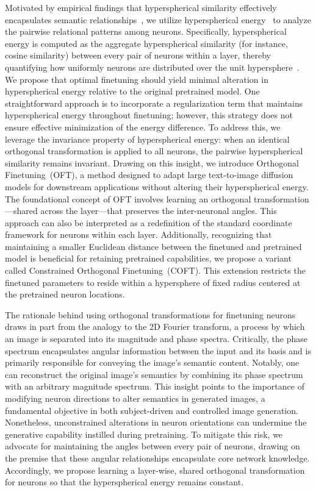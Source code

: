 Motivated by empirical findings that hyperspherical similarity effectively encapsulates semantic relationships~\cite{liu2017deep,liu2018decoupled,chen2020angular}, we utilize hyperspherical energy~\cite{liu2018learning} to analyze the pairwise relational patterns among neurons. Specifically, hyperspherical energy is computed as the aggregate hyperspherical similarity (for instance, cosine similarity) between every pair of neurons within a layer, thereby quantifying how uniformly neurons are distributed over the unit hypersphere~\cite{liu2021learning}. We propose that optimal finetuning should yield minimal alteration in hyperspherical energy relative to the original pretrained model. One straightforward approach is to incorporate a regularization term that maintains hyperspherical energy throughout finetuning; however, this strategy does not ensure effective minimization of the energy difference. To address this, we leverage the invariance property of hyperspherical energy: when an identical orthogonal transformation is applied to all neurons, the pairwise hyperspherical similarity remains invariant. Drawing on this insight, we introduce Orthogonal Finetuning~(OFT), a method designed to adapt large text-to-image diffusion models for downstream applications without altering their hyperspherical energy. The foundational concept of OFT involves learning an orthogonal transformation—shared across the layer—that preserves the inter-neuronal angles. This approach can also be interpreted as a redefinition of the standard coordinate framework for neurons within each layer. Additionally, recognizing that maintaining a smaller Euclidean distance between the finetuned and pretrained model is beneficial for retaining pretrained capabilities, we propose a variant called Constrained Orthogonal Finetuning~(COFT). This extension restricts the finetuned parameters to reside within a hypersphere of fixed radius centered at the pretrained neuron locations.

The rationale behind using orthogonal transformations for finetuning neurons draws in part from the analogy to the 2D Fourier transform, a process by which an image is separated into its magnitude and phase spectra. Critically, the phase spectrum encapsulates angular information between the input and its basis and is primarily responsible for conveying the image's semantic content. Notably, one can reconstruct the original image’s semantics by combining its phase spectrum with an arbitrary magnitude spectrum. This insight points to the importance of modifying neuron directions to alter semantics in generated images, a fundamental objective in both subject-driven and controlled image generation. Nonetheless, unconstrained alterations in neuron orientations can undermine the generative capability instilled during pretraining. To mitigate this risk, we advocate for maintaining the angles between every pair of neurons, drawing on the premise that these angular relationships encapsulate core network knowledge. Accordingly, we propose learning a layer-wise, shared orthogonal transformation for neurons so that the hyperspherical energy remains constant.

